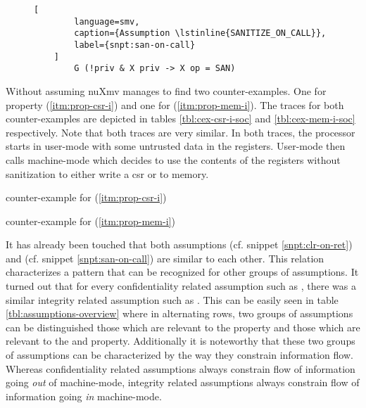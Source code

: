 \begin{figure}
    \begin{lstlisting}[
        language=smv,
        caption={Assumption \lstinline{SANITIZE_ON_CALL}},
        label={snpt:san-on-call}
    ]
        G (!priv & X priv -> X op = SAN)
    \end{lstlisting}
\end{figure}

Without assuming  nuXmv manages to find two counter-examples.
One for property  (\ref{itm:prop-csr-i}) and one for  (\ref{itm:prop-mem-i}).
The traces for both counter-examples are depicted in tables \ref{tbl:cex-csr-i-soc} and \ref{tbl:cex-mem-i-soc} respectively.
Note that both traces are very similar.
In both traces, the processor starts in user-mode with some untrusted data in the registers.
User-mode then calls machine-mode which decides to use the contents of the registers without sanitization to either write a \gls{csr} or to memory.

\begin{table}
    \centering
    
    \caption{ counter-example for  (\ref{itm:prop-csr-i})}
    \label{tbl:cex-csr-i-soc}
\end{table}

\begin{table}
    \centering
    
    \caption{ counter-example for  (\ref{itm:prop-mem-i})}
    \label{tbl:cex-mem-i-soc}
\end{table}

It has already been touched that both assumptions  (cf. snippet \ref{snpt:clr-on-ret}) and  (cf. snippet \ref{snpt:san-on-call}) are similar to each other.
This relation characterizes a pattern that can be recognized for other groups of assumptions.
It turned out that for every confidentiality related assumption such as , there was a similar integrity related assumption such as .
This can be easily seen in table \ref{tbl:assumptions-overview} where in alternating rows, two groups of assumptions can be distinguished those which are relevant to the  property and those which are relevant to the  and  property.
Additionally it is noteworthy that these two groups of assumptions can be characterized by the way they constrain information flow.
Whereas confidentiality related assumptions always constrain flow of information going \textit{out} of machine-mode, integrity related assumptions always constrain flow of information going \textit{in} machine-mode.

